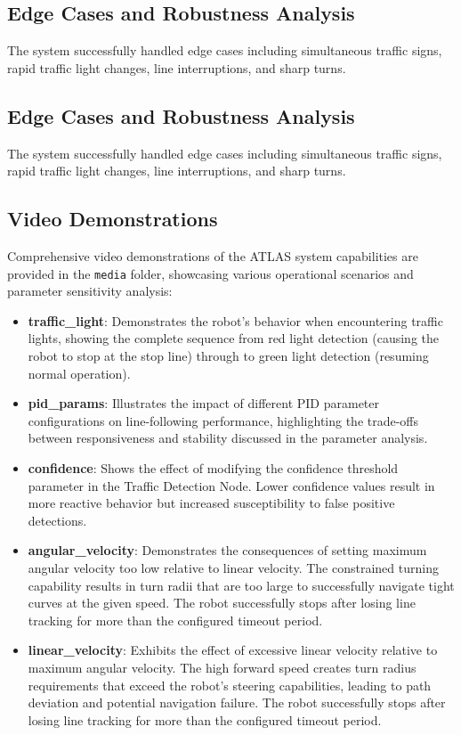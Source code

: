 \documentclass[9pt,technote]{IEEEtran}
\begin{document}
\subsection{Edge Cases and Robustness Analysis}
The system successfully handled edge cases including simultaneous traffic signs, rapid traffic light changes, line interruptions, and sharp turns.

\subsection{Edge Cases and Robustness Analysis}
The system successfully handled edge cases including simultaneous traffic signs, rapid traffic light changes, line interruptions, and sharp turns.

\subsection{Video Demonstrations}
Comprehensive video demonstrations of the ATLAS system capabilities are provided in the \texttt{media} folder, showcasing various operational scenarios and parameter sensitivity analysis:

\begin{itemize}
    \item \textbf{traffic\_light}: Demonstrates the robot's behavior when encountering traffic lights, showing the complete sequence from red light detection (causing the robot to stop at the stop line) through to green light detection (resuming normal operation).
    
    \item \textbf{pid\_params}: Illustrates the impact of different PID parameter configurations on line-following performance, highlighting the trade-offs between responsiveness and stability discussed in the parameter analysis.
    
    \item \textbf{confidence}: Shows the effect of modifying the confidence threshold parameter in the Traffic Detection Node. Lower confidence values result in more reactive behavior but increased susceptibility to false positive detections.
    
    \item \textbf{angular\_velocity}: Demonstrates the consequences of setting maximum angular velocity too low relative to linear velocity. The constrained turning capability results in turn radii that are too large to successfully navigate tight curves at the given speed. The robot successfully stops after losing line tracking for more than the configured timeout period.
    
    \item \textbf{linear\_velocity}: Exhibits the effect of excessive linear velocity relative to maximum angular velocity. The high forward speed creates turn radius requirements that exceed the robot's steering capabilities, leading to path deviation and potential navigation failure. The robot successfully stops after losing line tracking for more than the configured timeout period.
\end{itemize}
\end{document}
